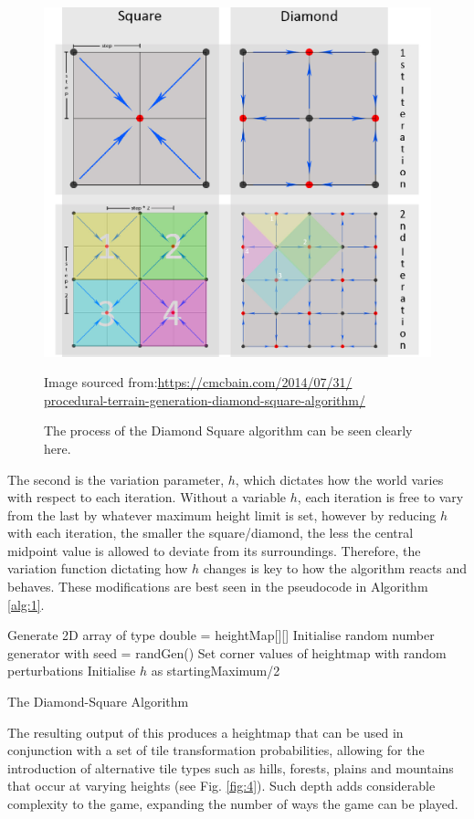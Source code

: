 \documentclass[12pt,a4paper]{article}
\begin{document}
\begin{figure}
  \centering
 	\includegraphics[width=0.4\linewidth]{images/diamondsquare.jpg}
	\caption[]{The process of the Diamond Square algorithm can be seen clearly here. }
	Image sourced from:\url{https://cmcbain.com/2014/07/31/}\\\url{procedural-terrain-generation-diamond-square-algorithm/}
	\label{fig:3}
\end{figure} 


The second is the variation parameter, $h$, which dictates how the world varies with respect to each iteration. Without a variable $h$, each iteration is free to vary from the last by whatever maximum height limit is set, however by reducing $h$ with each iteration, the smaller the square/diamond, the less the central midpoint value is allowed to deviate from its surroundings. Therefore, the variation function dictating how $h$ changes is key to how the algorithm reacts and behaves. These modifications are best seen in the pseudocode in Algorithm \ref{alg:1}.

\begin{algorithm}
\SetAlgoLined
{}
Generate 2D array of type double = heightMap[][]\;
Initialise random number generator with seed = randGen()\;
Set corner values of heightmap with random perturbations\;
Initialise $h$ as startingMaximum/2\;

\caption{The Diamond-Square Algorithm }
\label{alg:1}
\end{algorithm}

The resulting output of this produces a heightmap that can be used in conjunction with a set of tile transformation probabilities, allowing for the introduction of alternative tile types such as hills, forests, plains and mountains that occur at varying heights (see Fig. \ref{fig:4}). Such depth adds considerable complexity to the game, expanding the number of ways the game can be played.
\end{document}

